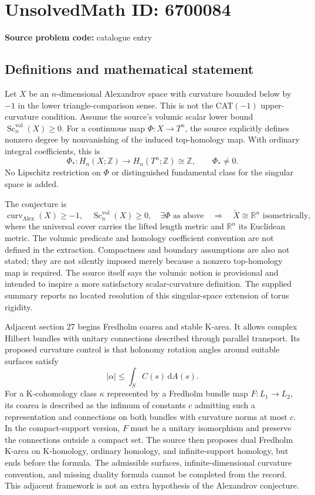 \documentclass[11pt]{article}
\newcommand{\Z}{\mathbb{Z}}
\newcommand{\R}{\mathbb{R}}
\begin{document}
\section*{UnsolvedMath ID: 6700084}
\textbf{Source problem code:} catalogue entry
\subsection{Definitions and mathematical statement}
Let \(X\) be an \(n\)-dimensional Alexandrov space with curvature bounded below by \(-1\) in the lower triangle-comparison sense. This is not the CAT\((-1)\) upper-curvature condition. Assume the source's volumic scalar lower bound \(\operatorname{Sc}^{\mathrm{vol}}_n(X)\ge0\). For a continuous map \(\Phi:X\to T^n\), the source explicitly defines nonzero degree by nonvanishing of the induced top-homology map. With ordinary integral coefficients, this is
\[
\Phi_*:H_n(X;\Z)\longrightarrow H_n(T^n;\Z)\cong\Z,
\qquad\Phi_*\ne0.
\]
No Lipschitz restriction on \(\Phi\) or distinguished fundamental class for the singular space is added.

The conjecture is
\[
\operatorname{curv}_{\mathrm{Alex}}(X)\ge-1,
\quad\operatorname{Sc}^{\mathrm{vol}}_n(X)\ge0,
\quad\exists\Phi\text{ as above}
\quad\Longrightarrow\quad
\widetilde X\cong\R^n\text{ isometrically},
\]
where the universal cover carries the lifted length metric and \(\R^n\) its Euclidean metric. The volumic predicate and homology coefficient convention are not defined in the extraction. Compactness and boundary assumptions are also not stated; they are not silently imposed merely because a nonzero top-homology map is required. The source itself says the volumic notion is provisional and intended to inspire a more satisfactory scalar-curvature definition. The supplied summary reports no located resolution of this singular-space extension of torus rigidity.

Adjacent section 27 begins Fredholm coarea and stable K-area. It allows complex Hilbert bundles with unitary connections described through parallel transport. Its proposed curvature control is that holonomy rotation angles around suitable surfaces satisfy
\[
|\alpha|\le\int_S C(s)\,\mathrm dA(s).
\]
For a K-cohomology class \(\kappa\) represented by a Fredholm bundle map \(F:L_1\to L_2\), its coarea is described as the infimum of constants \(c\) admitting such a representation and connections on both bundles with curvature norms at most \(c\). In the compact-support version, \(F\) must be a unitary isomorphism and preserve the connections outside a compact set. The source then proposes dual Fredholm K-area on K-homology, ordinary homology, and infinite-support homology, but ends before the formula. The admissible surfaces, infinite-dimensional curvature convention, and missing duality formula cannot be completed from the record. This adjacent framework is not an extra hypothesis of the Alexandrov conjecture.
\end{document}
